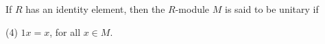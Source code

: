 If $R$ has an identity element, then the $R$-module $M$ is said to be unitary if

(4) $1x = x$, for all $x \in M$.
